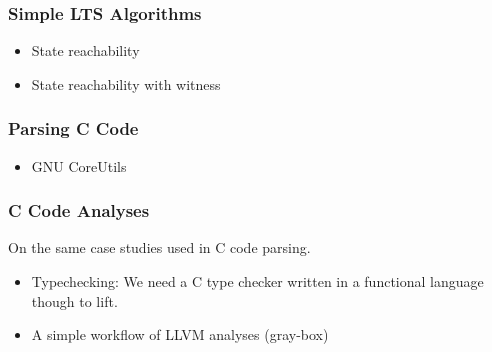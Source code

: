\documentclass[12pt]{article}
\begin{document}
\subsubsection{Simple LTS Algorithms}
\begin{itemize}
	\item State reachability
	\item State reachability with witness
\end{itemize}

\subsubsection{Parsing C Code}
\begin{itemize}
	\item GNU CoreUtils
	
\end{itemize}

\subsubsection{C Code Analyses}
On the same case studies used in C code parsing.
\begin{itemize}
	\item Typechecking: We need a C type checker written in a functional language though to lift.
	\item A simple workflow of LLVM analyses (gray-box)
\end{itemize}

\end{document}
